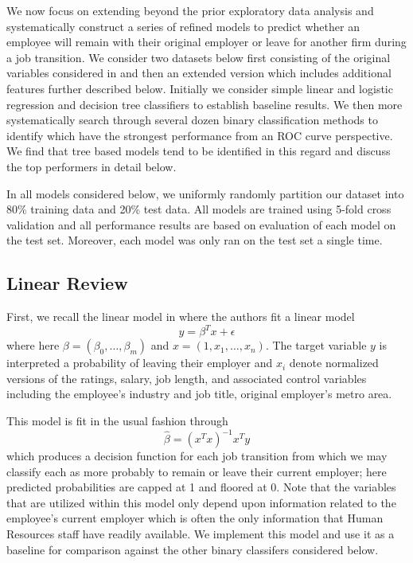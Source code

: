 \documentclass[10pt]{article}
\begin{document}
We now focus on extending beyond the prior exploratory data analysis and systematically construct 
a series of refined models to predict whether an employee will remain with their original employer or 
leave for another firm during a job transition.  We consider two datasets below first 
consisting of the original variables considered in \cite{Smart2016} and then an extended 
version which includes additional features further described below. Initially we 
consider simple linear and logistic regression and decision tree classifiers to establish 
baseline results.  We then more systematically search through several dozen binary classification 
methods to identify which have the strongest performance from an ROC curve perspective.  We find 
that tree based models tend to be identified in this regard and discuss the top performers 
in detail below. 

In all models considered below, we uniformly randomly partition our dataset into 80\% training data 
and 20\% test data.  All models are trained using 5-fold cross validation and all performance 
results are based on evaluation of each model on the test set.  Moreover, each model 
was only ran on the test set a single time. 

\subsection{Linear Review}
First, we recall the linear model in \cite{Smart2016} where the authors fit a linear model 
%
\begin{equation} 
    y = \beta^Tx + \epsilon 
\end{equation} 
% 
where here $\beta = (\beta_0,\ldots,\beta_m)$ and $x=(1,x_1,\ldots,x_{n})$. The 
target variable $y$ is interpreted a probability of leaving their employer and 
$x_i$ denote normalized versions of the ratings, salary, job length, and 
associated control variables including the employee's industry and job title, original 
employer's metro area.

This model is fit in the usual fashion through 
%
\begin{equation}
    \hat{\beta} = (x^Tx)^{-1}x^Ty
\end{equation}
%
which produces a decision function for each job transition from which we may classify 
each as more probably to remain or leave their current employer; here predicted probabilities 
are capped at 1 and floored at 0. Note that the variables 
that are utilized within this model only depend upon information related to the employee's 
current employer which is often the only information that Human Resources staff have 
readily available.  We implement this model and use it as a baseline for comparison against the other
binary classifers considered below. 
\end{document}

